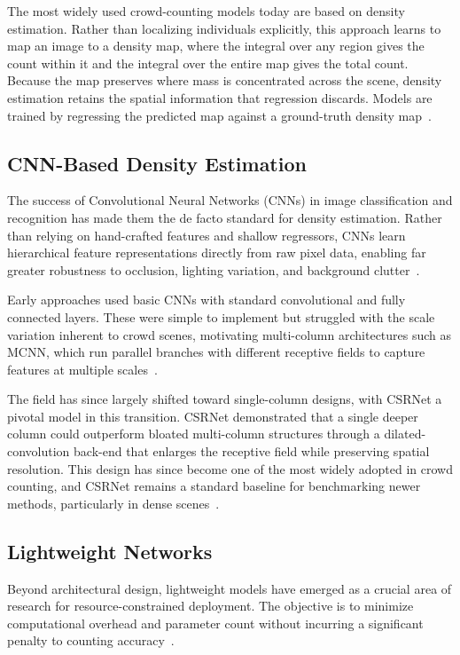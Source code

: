 \documentclass[conference]{IEEEtran}
\begin{document}
The most widely used crowd-counting models today are based on density
estimation. Rather than localizing individuals explicitly, this approach learns
to map an image to a density map, where the integral over any region gives the
count within it and the integral over the entire map gives the total count.
Because the map preserves where mass is concentrated across the scene, density
estimation retains the spatial information that regression discards. Models are
trained by regressing the predicted map against a ground-truth density
map~\cite{wang2020mobilecount, li2018csrnet, gao2020crowdcountingsurvey}.

\subsection{CNN-Based Density Estimation}
The success of Convolutional Neural Networks (CNNs) in image classification and
recognition has made them the de facto standard for density estimation. Rather
than relying on hand-crafted features and shallow regressors, CNNs learn
hierarchical feature representations directly from raw pixel data, enabling far
greater robustness to occlusion, lighting variation, and background
clutter~\cite{gao2020crowdcountingsurvey, li2018csrnet}.

Early approaches used basic CNNs with standard convolutional and fully connected
layers. These were simple to implement but struggled with the scale variation
inherent to crowd scenes, motivating multi-column architectures such as MCNN,
which run parallel branches with different receptive fields to capture features
at multiple scales~\cite{Zhang_2016_CVPR}.

The field has since largely shifted toward single-column designs, with CSRNet a
pivotal model in this transition. CSRNet demonstrated that a single deeper column
could outperform bloated multi-column structures through a dilated-convolution
back-end that enlarges the receptive field while preserving spatial resolution.
This design has since become one of the most widely adopted in crowd counting,
and CSRNet remains a standard baseline for benchmarking newer methods,
particularly in dense scenes~\cite{gao2020crowdcountingsurvey, li2018csrnet}.

\subsection{Lightweight Networks}
Beyond architectural design, lightweight models have emerged as a crucial area of
research for resource-constrained deployment. The objective is to minimize
computational overhead and parameter count without incurring a significant
penalty to counting accuracy~\cite{gao2020crowdcountingsurvey,
wang2020mobilecount}.
\end{document}
